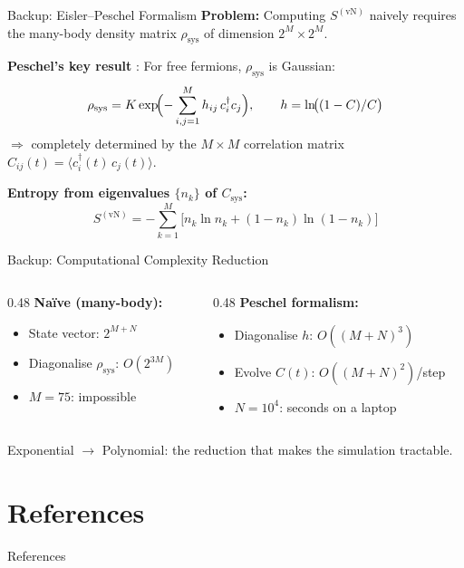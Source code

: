 \documentclass[aspectratio=169,11pt]{beamer}
\begin{document}
\begin{frame}{Backup: Eisler--Peschel Formalism}
    \textbf{Problem:} Computing $S^{(\mathrm{vN})}$ naively requires the many-body density matrix $\rho_{\mathrm{sys}}$ of dimension $2^M \times 2^M$.

    \vspace{0.3cm}

    \textbf{Peschel's key result} \cite{Peschel_2009}: For free fermions, $\rho_{\mathrm{sys}}$ is Gaussian:
    \[
    \rho_{\mathrm{sys}} = K \exp\!\Bigl(-\sum_{i,j=1}^{M} h_{ij}\, c_i^\dagger c_j\Bigr), \qquad h = \ln\!\bigl((1-C)/C\bigr)
    \]
    $\Rightarrow$ \alert{completely determined} by the $M \times M$ correlation matrix $C_{ij}(t) = \langle c_i^\dagger(t)\, c_j(t)\rangle$.

    \vspace{0.3cm}

    \textbf{Entropy from eigenvalues $\{n_k\}$ of $C_{\mathrm{sys}}$:}
    \[
    S^{(\mathrm{vN})} = -\sum_{k=1}^{M}\bigl[n_k \ln n_k + (1{-}n_k)\ln(1{-}n_k)\bigr]
    \]
\end{frame}

\begin{frame}{Backup: Computational Complexity Reduction}
    \begin{columns}[T]
    \begin{column}{0.48\textwidth}
        \textbf{Na\"ive (many-body):}
        \begin{itemize}
            \item State vector: $2^{M+N}$
            \item Diagonalise $\rho_{\mathrm{sys}}$: $O(2^{3M})$
            \item $M{=}75$: \alert{impossible}
        \end{itemize}
    \end{column}
    \begin{column}{0.48\textwidth}
        \textbf{Peschel formalism:}
        \begin{itemize}
            \item Diagonalise $h$: $O((M{+}N)^3)$
            \item Evolve $C(t)$: $O((M{+}N)^2)$/step
            \item $N{=}10^4$: \alert{seconds on a laptop}
        \end{itemize}
    \end{column}
    \end{columns}

    \vspace{0.5cm}
    \centering
    \alert{Exponential $\to$ Polynomial}: the reduction that makes the simulation tractable.
\end{frame}

\section*{References}
\begin{frame}[allowframebreaks]{References}
    \printbibliography[heading=none]
\end{frame}
\end{document}
